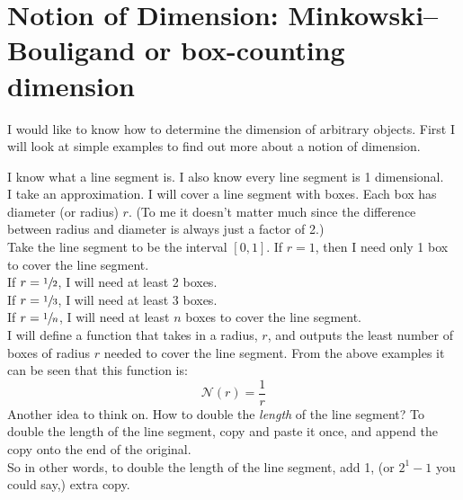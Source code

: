 \documentclass[11pt]{ekblite}
\begin{document}
\section{Notion of Dimension: Minkowski–Bouligand or box-counting dimension}
I would like to know how to determine the dimension of arbitrary objects. First I will look at simple examples to find out more about a notion of dimension.
\begin{example}
	I know what a line segment is. I also know every line segment is 1 dimensional.
	\\[0.2in]I take an approximation. I will cover a line segment with boxes. Each box has diameter (or radius) $r$. (To me it doesn't matter much since the difference between radius and diameter is always just a factor of 2.)
	\\[0.2in]Take the line segment to be the interval $[0,1]$. If $r = 1$, then I need only 1 box to cover the line segment.
	\\[0.2in]If $r = \sfrac{1}{2}$, I will need at least 2 boxes.
	\\[0.2in]If $r = \sfrac{1}{3}$, I will need at least 3 boxes.
	\\[0.2in]If $r = \sfrac{1}{n}$, I will need at least $n$ boxes to cover the line segment.
	\\[0.2in]I will define a function that takes in a radius, $r$, and outputs the least number of boxes of radius $r$ needed to cover the line segment. From the above examples it can be seen that this function is:
	\[\mathcal{N}(r) = \frac{1}{r}\]
	Another idea to think on. How to double the \textit{length} of the line segment? To double the length of the line segment, copy and paste it once, and append the copy onto the end of the original. 
	\\[0.2in]So in other words, to double the length of the line segment, add 1, (or $2^1 - 1$ you could say,) extra copy.
\end{example}
\end{document}
